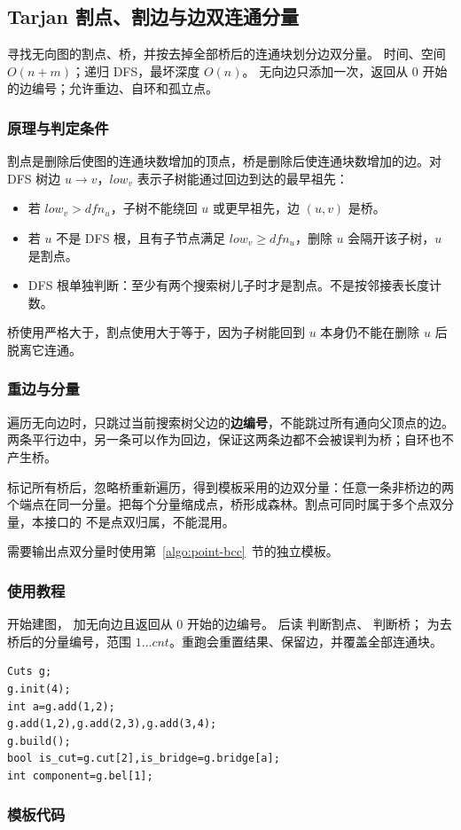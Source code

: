 \subsection{Tarjan 割点、割边与边双连通分量}
\label{algo:cuts}
\AlgorithmInfo
    {寻找无向图的割点、桥，并按去掉全部桥后的连通块划分边双分量。}
    {时间、空间 $O(n+m)$；递归 DFS，最坏深度 $O(n)$。}
    {无向边只添加一次，返回从 0 开始的边编号；允许重边、自环和孤立点。}

\subsubsection*{原理与判定条件}
割点是删除后使图的连通块数增加的顶点，桥是删除后使连通块数增加的边。对 DFS 树边 $u\to v$，$low_v$ 表示子树能通过回边到达的最早祖先：
\begin{itemize}
    \item 若 $low_v>dfn_u$，子树不能绕回 $u$ 或更早祖先，边 $(u,v)$ 是桥。
    \item 若 $u$ 不是 DFS 根，且有子节点满足 $low_v\geq dfn_u$，删除 $u$ 会隔开该子树，$u$ 是割点。
    \item DFS 根单独判断：至少有两个搜索树儿子时才是割点。不是按邻接表长度计数。
\end{itemize}
桥使用严格大于，割点使用大于等于，因为子树能回到 $u$ 本身仍不能在删除 $u$ 后脱离它连通。

\subsubsection*{重边与分量}
遍历无向边时，只跳过当前搜索树父边的\textbf{边编号}，不能跳过所有通向父顶点的边。两条平行边中，另一条可以作为回边，保证这两条边都不会被误判为桥；自环也不产生桥。

标记所有桥后，忽略桥重新遍历，得到模板采用的边双分量：任意一条非桥边的两个端点在同一分量。把每个分量缩成点，桥形成森林。割点可同时属于多个点双分量，本接口的  不是点双归属，不能混用。

需要输出点双分量时使用第~\ref{algo:point-bcc}~节的独立模板。

\subsubsection*{使用教程}
 开始建图， 加无向边且返回从 0 开始的边编号。 后读  判断割点、 判断桥； 为去桥后的分量编号，范围 $1\ldots cnt$。重跑会重置结果、保留边，并覆盖全部连通块。
\begin{lstlisting}[style=mtycpp,numbers=none]
Cuts g;
g.init(4);
int a=g.add(1,2);
g.add(1,2),g.add(2,3),g.add(3,4);
g.build();
bool is_cut=g.cut[2],is_bridge=g.bridge[a];
int component=g.bel[1];
\end{lstlisting}

\subsubsection*{模板代码}
